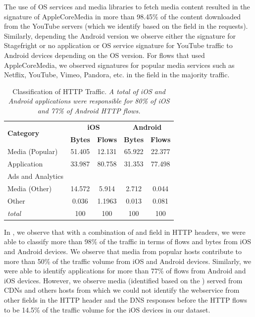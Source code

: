 The use of OS services and media libraries to fetch media content resulted in the signature of AppleCoreMedia in more than 98.45\% of the content downloaded from the YouTube servers (which we identify based on the \httphost field in the \httpget requests). 
Similarly, depending the Android version we observe either the signature for Stagefright\cite{android:stagefright} or no application or OS service signature for YouTube traffic to Android devices depending on the OS version. 
For flows that used AppleCoreMedia, we observed signatures for popular media services such as Netflix, YouTube, Vimeo, Pandora, etc. in the \httphost field in the majority traffic. 

\begin{table}
\centering
\begin{small}
\begin{tabular}{|p{}|c|c|c|c|}
\hline
\multirow{2}{*}{\bf Category} & \multicolumn{2}{c|}{\bf iOS} &  \multicolumn{2}{c|}{\bf Android} \tabularnewline
\cline{2-5}
  & {\bf Bytes}  & {\bf Flows} & {\bf Bytes} & {\bf Flows}   \tabularnewline
\hline
Media (Popular)         & 51.405  & 12.131 & 65.922 & 22.377 \tabularnewline
\hline
Application             & 33.987  & 80.758 & 31.353 & 77.498 \tabularnewline
\hline
Ads and Analytics       & \tbd{}  & \tbd{} & \tbd{}& \tbd{}\tabularnewline
\hline
Media (Other)           & 14.572  &  5.914 &  2.712 &  0.044 \tabularnewline
\hline
Other                   &  0.036  & 1.1963 &  0.013 &  0.081 \tabularnewline
\hline
{\em total}             & 100 & 100 & 100 & 100 \tabularnewline
\hline
\end{tabular}
\end{small}
\caption{Classification of HTTP Traffic. \emph{A total of \tbd{} iOS and \tbd{}Android applications were responsible for 80\% of iOS and 77\% of Android HTTP flows.}}
\label{tab:classify-http}
\end{table}

In , we observe that with a combination of \useragent and \httphost field in HTTP headers, we were able to classify more than 98\% of the traffic in terms of flows and bytes from iOS and Android devices.
We observe that media from popular hosts contribute to more than 50\% of the traffic volume from iOS and Android devices.
Similarly, we were able to identify applications for more than 77\% of flows from Android and iOS devices. 
However, we observe media (identified based on the \useragent) served from CDNs and others hosts from which we could not identify the webservice from other fields in the HTTP header and the DNS responses before the HTTP flows to be 14.5\% of the traffic volume for the iOS devices in our dataset.

